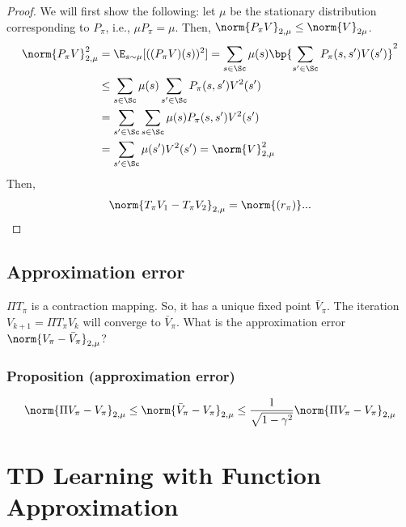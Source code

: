 \begin{proof}
    We will first show the following: let $\mu$ be the stationary distribution corresponding to $P_\pi$, i.e., $\mu P_\pi = \mu$. Then, $\norm{P_\pi V}_{2,\mu} \leq \norm{V}_{2\mu}$.
    \begin{align*}
        \norm{P_\pi V}_{2, \mu}^2 & = \E_{s\sim \mu} [((P_\pi V)(s))^2] = \sum_{s \in \Sc} \mu(s) \bp{\sum_{s'\in\Sc} P_\pi(s,s')V(s')}^2 \\
                                  & \leq \sum_{s\in\Sc} \mu(s) \sum_{s'\in\Sc} P_\pi(s,s')V^2(s')                                         \\
                                  & = \sum_{s'\in\Sc}\sum_{s\in\Sc} \mu(s) P_\pi(s,s') V^2(s')                                            \\
                                  & = \sum_{s'\in\Sc} \mu(s')V^2(s') = \norm{V}_{2,\mu}^2
    \end{align*}
    Then,
    \begin{align*}
        \norm{T_\pi V_1 - T_\pi V_2}_{2,\mu} = \norm{(r_\pi)} ...
    \end{align*}
\end{proof}

\subsection{Approximation error}
$\Pi T_\pi$ is a contraction mapping. So, it has a unique fixed point $\bar{V}_\pi$. The iteration $V_{k+1} = \Pi T_\pi V_k$ will converge to $\bar{V}_\pi$. What is the approximation error $\norm{V_\pi - \bar{V}_\pi}_{2,\mu}$?
\subsubsection{Proposition (approximation error)}
\[
    \norm{\Pi V_\pi - V_\pi}_{2,\mu} \leq \norm{\bar{V}_\pi - V_\pi}_{2,\mu} \leq \frac{1}{\sqrt{1-\gamma^2}} \norm{\Pi V_\pi - V_\pi}_{2,\mu}
\]
\section{TD Learning with Function Approximation}
